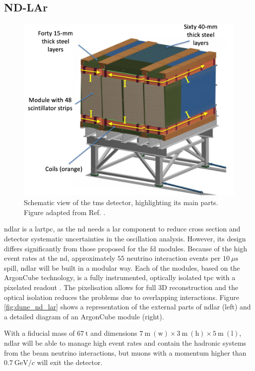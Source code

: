 \subsection{ND-LAr}

\begin{figure}[t]
	\centering
	\includegraphics[width=0.65\linewidth]{Images/DUNE/ND/nd_tms}
	\caption[Schematic view of the \gls{tms} detector, highlighting its main parts.]{Schematic view of the \gls{tms} detector, highlighting its main parts. Figure adapted from Ref. \cite{Nehm2024}.}
	\label{fig:dune_tms}
\end{figure}

\gls{ndlar} is a \gls{lartpc}, as the \gls{nd} needs a \gls{lar} component to reduce cross section and detector systematic uncertainties in the oscillation analysis. However, its design differs significantly from those proposed for the \gls{fd} modules. Because of the high event rates at the \gls{nd}, approximately $55$ neutrino interaction events per $10~\mu\mathrm{s}$ spill, \gls{ndlar} will be built in a modular way. Each of the modules, based on the ArgonCube technology, is a fully instrumented, optically isolated \gls{tpc} with a pixelated readout \cite{Asaadi2019}. The pixelisation allows for full 3D reconstruction and the optical isolation reduces the problems due to overlapping interactions. Figure \ref{fig:dune_nd_lar} shows a representation of the external parts of \gls{ndlar} (left) and a detailed diagram of an ArgonCube module (right).

With a fiducial mass of $67~\mathrm{t}$ and dimensions $7~\mathrm{m} \ (\text{w}) \times 3~\mathrm{m} \ (\text{h}) \times 5~\mathrm{m} \ (\text{l})$, \gls{ndlar} will be able to manage high event rates and contain the hadronic systems from the beam neutrino interactions, but muons with a momentum higher than $0.7~\mathrm{GeV}/c$ will exit the detector.

